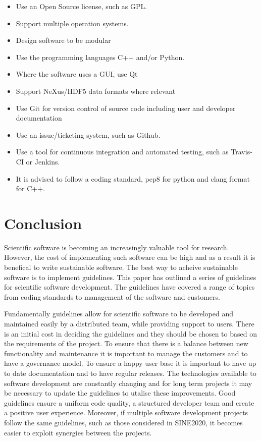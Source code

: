 \documentclass[jnr]{iosart2x}
\begin{document}
\begin{itemize}
      \item Use an Open Source license, such as GPL.
      \item Support multiple operation systems.
	  
      \item Design software to be modular
	  
      \item Use the programming languages C++ and/or Python.
	  
      \item Where the software uses a GUI, use Qt
	  	  
      \item Support NeXus/HDF5 data formats where relevant
	  
      \item Use Git for version control of source code including user and developer documentation
	 
      \item Use an issue/ticketing system, such as Github.
	  
      \item Use a tool for continuous integration and automated testing, such as Travis-CI or Jenkins.
	  
      \item It is advised to follow a coding standard, pep8 for python and clang format for C++.
\end{itemize}

\section{Conclusion}
\label{Conclusion}

Scientific software is becoming an increasingly valuable tool for research.
However, the cost of implementing such software can be high and as a result it is benefical to write sustainable software.
The best way to acheive sustainable software is to implement guidelines.
This paper has outlined a series of guidelines for scientific software development.
The guidelines have covered a range of topics from coding standards to management of the software and customers.

Fundamentally guidelines allow for scientific software to be developed and maintained easily by a distributed team, while providing support to users.
There is an initial cost in deciding the guidelines and they should be chosen to based on the requirements of the project.
To ensure that there is a balance between new functionality and maintenance it is important to manage the customers and to have a governance model.
To ensure a happy user base it is important to have up to date documentation and to have regular releases.
The technologies available to software development are constantly changing and for long term projects it may be necessary to update the guidelines to utalise these improvements.
Good guidelines ensure a uniform code quality, a structured developer team and create a positive user experience. Moreover, if multiple software development projects follow the same guidelines, such as those considered in SINE2020, it becomes easier to exploit synergies between the projects.
\end{document}
